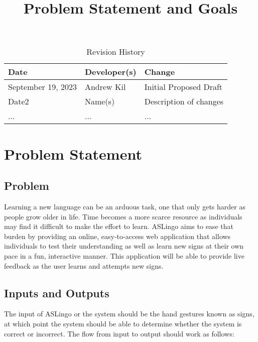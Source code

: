 \documentclass{article}
\title{Problem Statement and Goals\\\progname}
\author{\authname}
\date{}
\begin{document}
\maketitle

\begin{table}[hp]
\caption{Revision History} \label{TblRevisionHistory}
\begin{tabularx}{\textwidth}{llX}
\toprule
\textbf{Date} & \textbf{Developer(s)} & \textbf{Change}\\
\midrule
September 19, 2023 & Andrew Kil & Initial Proposed Draft\\
Date2 & Name(s) & Description of changes\\
... & ... & ...\\
\bottomrule
\end{tabularx}
\end{table}

\section{Problem Statement}



\subsection{Problem}

Learning a new language can be an arduous task, one that only gets harder as people grow older in life. Time becomes a more scarce resource as individuals may find it difficult to make the effort to learn. ASLingo aims to ease that burden by providing an online, easy-to-access web application that allows individuals to test their understanding as well as learn new signs at their own pace in a fun, interactive manner. This application will be able to provide live feedback as the user learns and attempts new signs.

\subsection{Inputs and Outputs}

The input of ASLingo or the system should be the hand gestures known as signs, at which point the system should be able to determine whether the system is correct or incorrect. The flow from input to output should work as follows:
\end{document}
